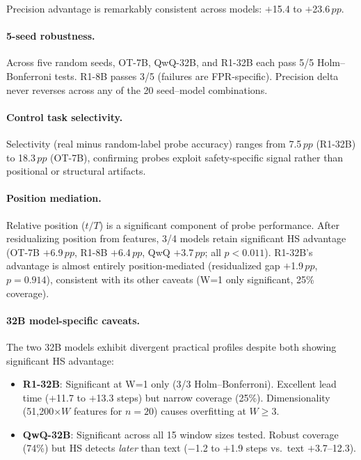 \documentclass[11pt,a4paper]{article}
\newcommand{\pp}{\,pp}
\begin{document}
Precision advantage is remarkably consistent across models: $+$15.4 to $+$23.6$\pp$.

\paragraph{5-seed robustness.}
Across five random seeds, OT-7B, QwQ-32B, and R1-32B each pass 5/5 Holm--Bonferroni tests.
R1-8B passes 3/5 (failures are FPR-specific).
Precision delta never reverses across any of the 20 seed--model combinations.

\paragraph{Control task selectivity.}
Selectivity (real minus random-label probe accuracy) ranges from 7.5$\pp$ (R1-32B) to 18.3$\pp$ (OT-7B), confirming probes exploit safety-specific signal rather than positional or structural artifacts.

\paragraph{Position mediation.}
Relative position ($t/T$) is a significant component of probe performance.
After residualizing position from features, 3/4 models retain significant HS advantage (OT-7B $+$6.9$\pp$, R1-8B $+$6.4$\pp$, QwQ $+$3.7$\pp$; all $p < 0.011$).
R1-32B's advantage is almost entirely position-mediated (residualized gap $+$1.9$\pp$, $p = 0.914$), consistent with its other caveats (W=1 only significant, 25\% coverage).

\paragraph{32B model-specific caveats.}
The two 32B models exhibit divergent practical profiles despite both showing significant HS advantage:

\begin{itemize}[nosep,leftmargin=*]
\item \textbf{R1-32B}: Significant at W=1 only (3/3 Holm--Bonferroni). Excellent lead time ($+$11.7 to $+$13.3 steps) but narrow coverage (25\%). Dimensionality (51{,}200$\times W$ features for $n=20$) causes overfitting at $W \geq 3$.
\item \textbf{QwQ-32B}: Significant across all 15 window sizes tested. Robust coverage (74\%) but HS detects \emph{later} than text ($-$1.2 to $+$1.9 steps vs.\ text $+$3.7--12.3).
\end{itemize}
\end{document}
